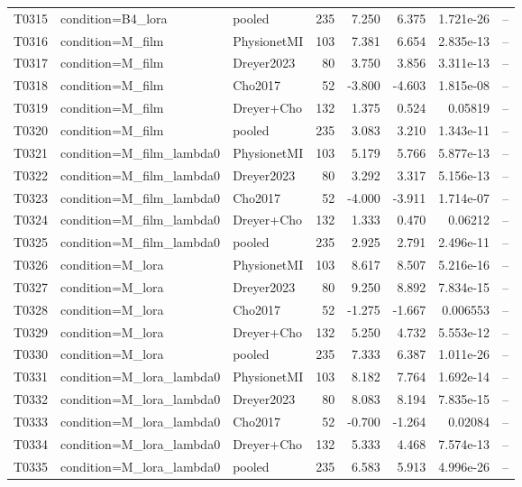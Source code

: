 \begin{longtable}{p{.45in}p{2.6in}p{.75in}rrrrr}
T0315 & condition=B4\_\allowbreak{}lora & pooled & 235 & 7.250 & 6.375 & 1.721e-26 & -- \\
T0316 & condition=M\_\allowbreak{}film & PhysionetMI & 103 & 7.381 & 6.654 & 2.835e-13 & -- \\
T0317 & condition=M\_\allowbreak{}film & Dreyer2023 & 80 & 3.750 & 3.856 & 3.311e-13 & -- \\
T0318 & condition=M\_\allowbreak{}film & Cho2017 & 52 & -3.800 & -4.603 & 1.815e-08 & -- \\
T0319 & condition=M\_\allowbreak{}film & Dreyer+Cho & 132 & 1.375 & 0.524 & 0.05819 & -- \\
T0320 & condition=M\_\allowbreak{}film & pooled & 235 & 3.083 & 3.210 & 1.343e-11 & -- \\
T0321 & condition=M\_\allowbreak{}film\_\allowbreak{}lambda0 & PhysionetMI & 103 & 5.179 & 5.766 & 5.877e-13 & -- \\
T0322 & condition=M\_\allowbreak{}film\_\allowbreak{}lambda0 & Dreyer2023 & 80 & 3.292 & 3.317 & 5.156e-13 & -- \\
T0323 & condition=M\_\allowbreak{}film\_\allowbreak{}lambda0 & Cho2017 & 52 & -4.000 & -3.911 & 1.714e-07 & -- \\
T0324 & condition=M\_\allowbreak{}film\_\allowbreak{}lambda0 & Dreyer+Cho & 132 & 1.333 & 0.470 & 0.06212 & -- \\
T0325 & condition=M\_\allowbreak{}film\_\allowbreak{}lambda0 & pooled & 235 & 2.925 & 2.791 & 2.496e-11 & -- \\
T0326 & condition=M\_\allowbreak{}lora & PhysionetMI & 103 & 8.617 & 8.507 & 5.216e-16 & -- \\
T0327 & condition=M\_\allowbreak{}lora & Dreyer2023 & 80 & 9.250 & 8.892 & 7.834e-15 & -- \\
T0328 & condition=M\_\allowbreak{}lora & Cho2017 & 52 & -1.275 & -1.667 & 0.006553 & -- \\
T0329 & condition=M\_\allowbreak{}lora & Dreyer+Cho & 132 & 5.250 & 4.732 & 5.553e-12 & -- \\
T0330 & condition=M\_\allowbreak{}lora & pooled & 235 & 7.333 & 6.387 & 1.011e-26 & -- \\
T0331 & condition=M\_\allowbreak{}lora\_\allowbreak{}lambda0 & PhysionetMI & 103 & 8.182 & 7.764 & 1.692e-14 & -- \\
T0332 & condition=M\_\allowbreak{}lora\_\allowbreak{}lambda0 & Dreyer2023 & 80 & 8.083 & 8.194 & 7.835e-15 & -- \\
T0333 & condition=M\_\allowbreak{}lora\_\allowbreak{}lambda0 & Cho2017 & 52 & -0.700 & -1.264 & 0.02084 & -- \\
T0334 & condition=M\_\allowbreak{}lora\_\allowbreak{}lambda0 & Dreyer+Cho & 132 & 5.333 & 4.468 & 7.574e-13 & -- \\
T0335 & condition=M\_\allowbreak{}lora\_\allowbreak{}lambda0 & pooled & 235 & 6.583 & 5.913 & 4.996e-26 & -- \\
\bottomrule
\end{longtable}
